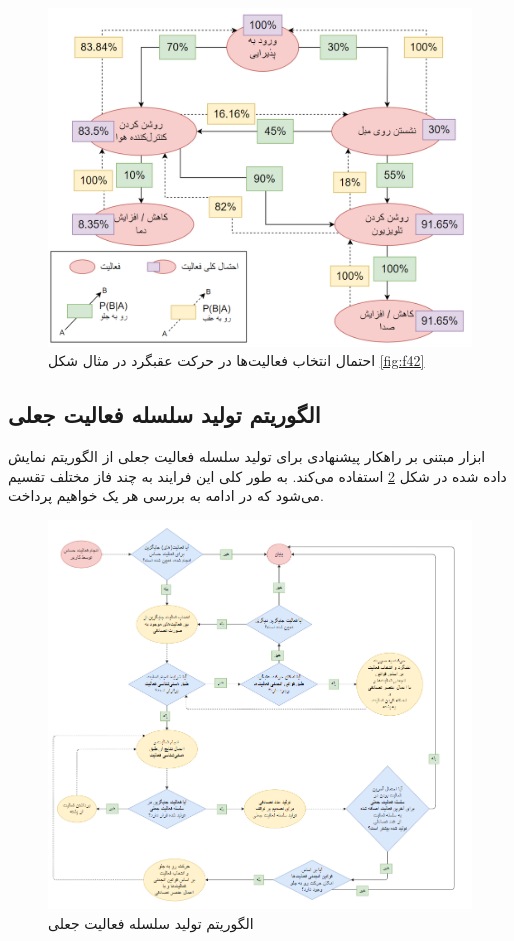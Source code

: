 \begin{figure}[htp]
\centerline{\includegraphics[width=1\textwidth]{figs/f44.png}}
\caption[احتمال انتخاب فعالیت‌ها در حرکت عقبگرد]{احتمال انتخاب فعالیت‌ها در حرکت عقبگرد در مثال شکل \ref{fig:f42}}
\label{fig:f44}
\end{figure}

\subsection{‌الگوریتم تولید سلسله فعالیت جعلی}\label{chapter:c443}

ابزار مبتنی بر راهکار پیشنهادی برای تولید سلسله فعالیت جعلی از الگوریتم نمایش داده شده در شکل \ref{fig:f43} استفاده می‌کند. به طور کلی این فرایند به چند فاز مختلف تقسیم می‌شود که در ادامه به بررسی هر یک خواهیم پرداخت.

\begin{figure}[htp]
\centerline{\includegraphics[width=1\textwidth]{figs/f43.png}}
\caption{الگوریتم تولید سلسله فعالیت جعلی}
\label{fig:f43}
\end{figure}

